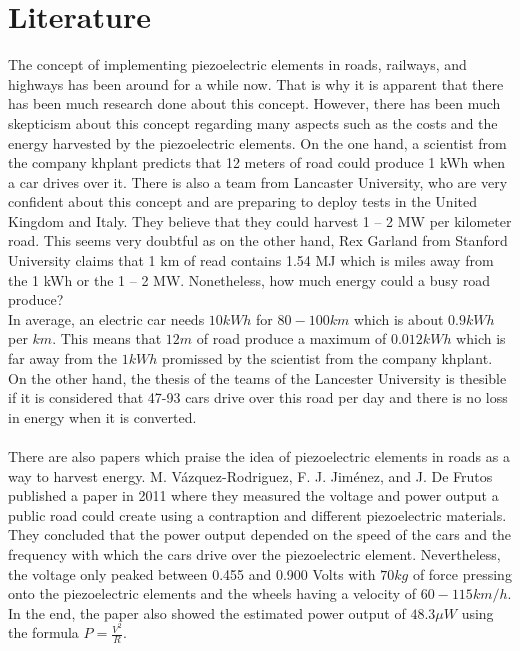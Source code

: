 \chapter{Literature}

The concept of implementing piezoelectric elements in roads, railways, and highways has been around for a while now. That is why it is apparent that there has been much research done about this concept. However, there has been much skepticism about this concept regarding many aspects such as the costs and the energy harvested by the piezoelectric elements. On the one hand, a scientist from the company khplant predicts that 12 meters of road could produce 1 kWh when a car drives over it. There is also a team from Lancaster University, who are very confident about this concept and are preparing to deploy tests in the United Kingdom and Italy. They believe that they could harvest 1 – 2 MW per kilometer road. This seems very doubtful as on the other hand, Rex Garland from Stanford University claims that 1 km of read contains 1.54 MJ which is miles away from the 1 kWh or the 1 – 2 MW. Nonetheless, how much energy could a busy road produce?\cite{khplant2023,Garland2013}\\
In average, an electric car needs $10kWh$ for $80 - 100 km$ which is about $0.9kWh$ per $km$. This means that $12m$ of road produce a maximum of $0.012kWh$ which is far away from the $1 kWh$ promissed by the scientist from the company khplant. On the other hand, the thesis of the teams of the Lancester University is thesible if it is considered that 47-93 cars drive over this road per day and there is no loss in energy when it is converted.\\  
\\
There are also papers which praise the idea of piezoelectric elements in roads as a way to harvest energy. M. Vázquez-Rodriguez, F. J. Jiménez, and J. De Frutos published a paper in 2011 where they measured the voltage and power output a public road could create using a contraption and different piezoelectric materials. They concluded that the power output depended on the speed of the cars and the frequency with which the cars drive over the piezoelectric element. Nevertheless, the voltage only peaked between 0.455 and 0.900 Volts with $70 kg$ of force pressing onto the piezoelectric elements and the wheels having a velocity of $60 - 115km/h$. In the end, the paper also showed the estimated power output of $48.3 \mu W$ using the formula $P = \frac{V^2}{R}$. \cite{M.VAZQUEZRODRIGUEZ2011}\\
